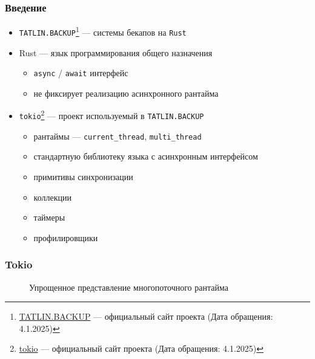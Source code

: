 \documentclass{beamer}
\begin{document}
\begin{frame}[fragile]
  \frametitle{Введение}
  \begin{itemize}
    \item \verb|TATLIN.BACKUP|\footnote{\href{https://yadro.com/ru/tatlin/backup}{TATLIN.BACKUP} --- официальный сайт проекта (Дата обращения: 4.1.2025)} --- системы бекапов на \verb|Rust|
    \item Rust --- язык программирования общего назначения
    \begin{itemize}
      \item \verb|async| / \verb|await| интерфейс
      \item не фиксирует реализацию асинхронного рантайма
    \end{itemize}
    \item \verb|tokio|\footnote{\href{https://tokio.rs/}{tokio} --- официальный сайт проекта (Дата обращения: 4.1.2025)} --- проект используемый в \verb|TATLIN.BACKUP|
    \begin{itemize}
      \item рантаймы --- \verb|current_thread|, \verb|multi_thread|
      \item стандартную библиотеку языка с асинхронным интерфейсом
      \item примитивы синхронизации
      \item коллекции
      \item таймеры
      \item профилировщики
    \end{itemize}
  \end{itemize}
\end{frame}

\begin{frame}
  \frametitle{Tokio}

\begin{figure}[H]
    \begin{center}
    \end{center}

    \caption{Упрощенное представление многопоточного рантайма}
    \label{fig:tokio:arch}
\end{figure}

\end{frame}
\end{document}
